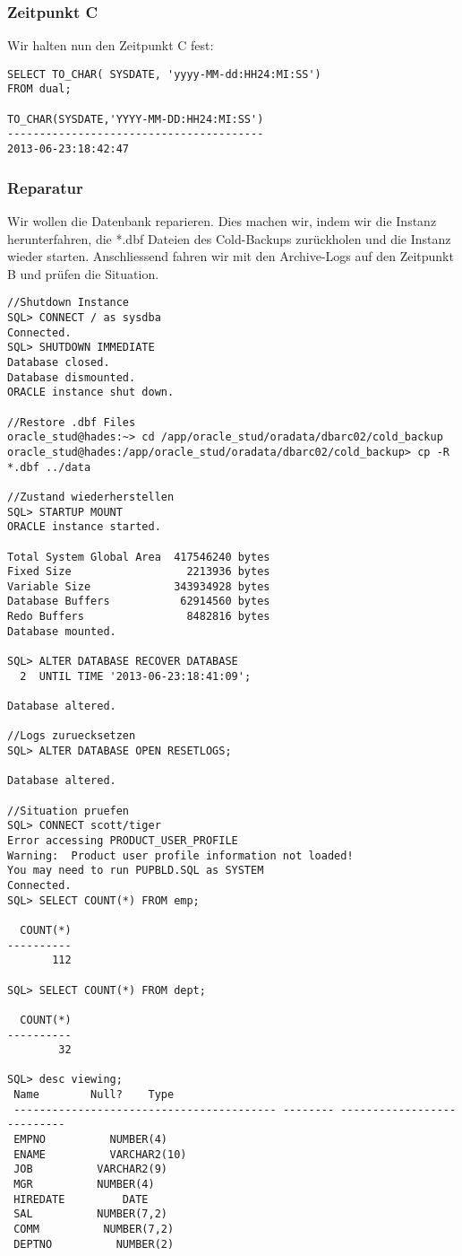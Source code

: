 \documentclass[11pt,a4paper,parskip=half]{scrartcl}
\begin{document}
\subsubsection{Zeitpunkt C}
Wir halten nun den Zeitpunkt C fest:
\begin{lstlisting}
SELECT TO_CHAR( SYSDATE, 'yyyy-MM-dd:HH24:MI:SS')
FROM dual;

TO_CHAR(SYSDATE,'YYYY-MM-DD:HH24:MI:SS')
----------------------------------------
2013-06-23:18:42:47     
\end{lstlisting}

\subsubsection{Reparatur}
Wir wollen die Datenbank reparieren. Dies machen wir, indem wir die Instanz herunterfahren, die *.dbf Dateien des Cold-Backups zurückholen und die Instanz wieder starten. Anschliessend fahren wir mit den Archive-Logs auf den Zeitpunkt B und prüfen die Situation.

\begin{lstlisting}
//Shutdown Instance
SQL> CONNECT / as sysdba
Connected.
SQL> SHUTDOWN IMMEDIATE
Database closed.
Database dismounted.
ORACLE instance shut down.

//Restore .dbf Files
oracle_stud@hades:~> cd /app/oracle_stud/oradata/dbarc02/cold_backup
oracle_stud@hades:/app/oracle_stud/oradata/dbarc02/cold_backup> cp -R *.dbf ../data

//Zustand wiederherstellen
SQL> STARTUP MOUNT
ORACLE instance started.

Total System Global Area  417546240 bytes
Fixed Size                  2213936 bytes
Variable Size             343934928 bytes
Database Buffers           62914560 bytes
Redo Buffers                8482816 bytes
Database mounted.

SQL> ALTER DATABASE RECOVER DATABASE
  2  UNTIL TIME '2013-06-23:18:41:09';

Database altered.

//Logs zuruecksetzen
SQL> ALTER DATABASE OPEN RESETLOGS;

Database altered.

//Situation pruefen
SQL> CONNECT scott/tiger
Error accessing PRODUCT_USER_PROFILE
Warning:  Product user profile information not loaded!
You may need to run PUPBLD.SQL as SYSTEM
Connected.
SQL> SELECT COUNT(*) FROM emp;

  COUNT(*)
----------
       112

SQL> SELECT COUNT(*) FROM dept;

  COUNT(*)
----------
        32

SQL> desc viewing;
 Name        Null?    Type
 ----------------------------------------- -------- ---------------------------
 EMPNO          NUMBER(4)
 ENAME          VARCHAR2(10)
 JOB          VARCHAR2(9)
 MGR          NUMBER(4)
 HIREDATE         DATE
 SAL          NUMBER(7,2)
 COMM          NUMBER(7,2)
 DEPTNO          NUMBER(2)
\end{lstlisting}
\end{document}
